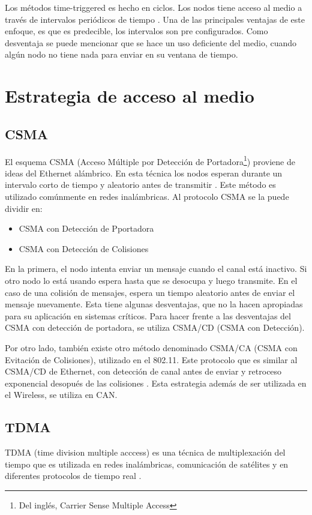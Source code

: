 Los métodos time-triggered es hecho en ciclos. Los nodos tiene acceso al medio a través de intervalos periódicos de tiempo \citep{Lisner07}. Una de las principales ventajas de este enfoque, es que es predecible, los intervalos son pre configurados. Como desventaja se puede mencionar que se hace un uso deficiente del medio, cuando algún nodo no tiene nada para enviar en su ventana de tiempo.

\section{Estrategia de acceso al medio}
\subsection{CSMA}\label{subsection:CSMA}
El esquema CSMA (Acceso Múltiple por Detección de Portadora\footnote{Del inglés, Carrier Sense Multiple Access}) proviene de ideas del Ethernet alámbrico. En esta técnica los nodos esperan durante un intervalo corto de tiempo y aleatorio antes de transmitir \citep{Tanenbaum03}. Este método es utilizado comúnmente en redes inalámbricas. Al protocolo CSMA se la puede dividir en:
\begin{itemize}
 \item CSMA con Detección de Pportadora
 \item CSMA con Detección de Colisiones
\end{itemize}

En la primera, el nodo intenta enviar un mensaje cuando el canal está inactivo. Si otro nodo lo está usando espera hasta que se desocupa y luego transmite. En el caso de una colisión de mensajes, espera un tiempo aleatorio antes de enviar el mensaje nuevamente. Esta tiene algunas desventajas, que no la hacen apropiadas para su aplicación en sistemas críticos. Para hacer frente a las desventajas del CSMA con detección de portadora, se utiliza CSMA/CD (CSMA con Detección).

Por otro lado, también existe otro método denominado CSMA/CA (CSMA con Evitación de Colisiones), utilizado en el 802.11. Este protocolo que es similar al CSMA/CD de Ethernet, con detección de canal antes de enviar y retroceso exponencial desopués de las colisiones \citep{Tanenbaum03}. Esta estrategia además de ser utilizada en el Wireless, se utiliza en CAN.

\subsection{TDMA}
TDMA (time division multiple acccess) es una técnica de multiplexación del tiempo que es utilizada en redes inalámbricas, comunicación de satélites y en diferentes protocolos de tiempo real \citep{Lisner07}.

